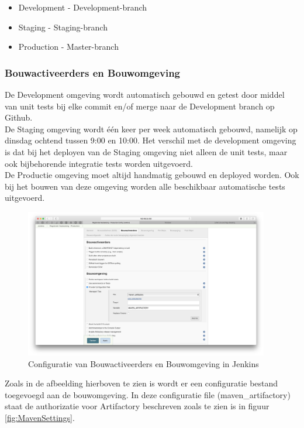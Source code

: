 \begin{itemize}
	\setlength\itemsep{0em}
	\item Development - Development-branch
	\item Staging - Staging-branch
	\item Production - Master-branch
\end{itemize}

\subsubsection{Bouwactiveerders en Bouwomgeving}
De Development omgeving wordt automatisch gebouwd en getest door middel van unit tests bij elke commit en/of merge naar de Development branch op Github. 
\\
De Staging omgeving wordt één keer per week automatisch gebouwd, namelijk op dinsdag ochtend tussen 9:00 en 10:00. Het verschil met de development omgeving is dat bij het deployen van de Staging omgeving niet alleen de unit tests, maar ook bijbehorende integratie tests worden uitgevoerd.
\\ 
De Productie omgeving moet altijd handmatig gebouwd en deployed worden. Ook bij het bouwen van deze omgeving worden alle beschikbaar automatische tests uitgevoerd.

\begin{figure}[H]
	\centering
	\includegraphics[width=0.95\textwidth]{img/JenkinsBouwactiveerdersBouwomgeving.png}
	\caption{Configuratie van Bouwactiveerders en Bouwomgeving in Jenkins}
	\label{fig:JenkinsBouwactiveerdersBouwomgeving}
\end{figure}

Zoals in de afbeelding hierboven te zien is wordt er een configuratie bestand toegevoegd aan de bouwomgeving. In deze configuratie file (maven\_artifactory) staat de authorizatie voor Artifactory beschreven zoals te zien is in figuur \ref{fig:MavenSettings}.

